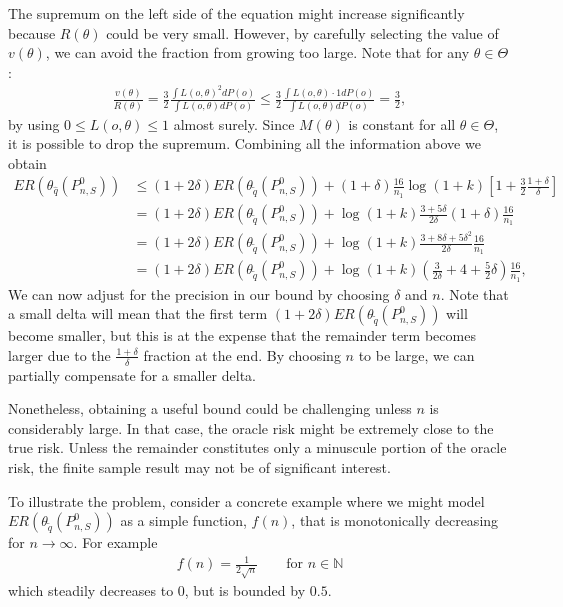 \documentclass[11pt, a4paper]{article}
\theoremstyle{definition}
\theoremstyle{remark}
\newcommand{\cl}{q}
\begin{document}
The supremum on the left side of the equation might increase significantly because $R(\theta)$ could be very small. However, by carefully selecting the value of $v(\theta)$, we can avoid the fraction from growing too large. Note that for any $ \theta \in \Theta $:
\begin{align*}
    \frac{v(\theta)}{R(\theta)} = \frac{3}{2} \frac{\int L(o, \theta)^2 d P(o)}{\int L(o, \theta) dP(o)  } \leq \frac{3}{2} \frac{\int L(o, \theta) \cdot 1 dP(o) }{\int L(o, \theta) dP(o) } = \frac{3}{2},
\end{align*}
by using $ 0 \leq L(o, \theta) \leq 1 $ almost surely. Since $ M(\theta) $ is constant for all $ \theta \in \Theta $, it is possible to drop the supremum. Combining all the information above we obtain 
\begin{align*}
   ER(\theta_{\hat{\cl}}(P_{n, S}^{0})) &\leq(1 + 2 \delta) ER(\theta_{ \tilde{\cl}}(P_{n,S}^{0})) +(1 + \delta) \frac{16}{n_1} \log (1 +k) \left[ 1 + \frac{3}{2} \frac{1 + \delta}{\delta}\right]\\
                                        &= (1 + 2 \delta) ER(\theta_{ \tilde{\cl}}(P_{n,S}^{0})) +\log (1 +k) \frac{3 + 5\delta}{2\delta}(1 + \delta) \frac{16}{n_1} \\
                                        &= (1 + 2 \delta) ER(\theta_{ \tilde{\cl}}(P_{n,S}^{0})) +\log (1 +k) \frac{3 + 8\delta + 5 \delta^2}{2\delta}\frac{16}{n_1} \\\
                                        &= (1 + 2 \delta) ER(\theta_{ \tilde{\cl}}(P_{n,S}^{0})) +\log (1 +k) \left( \frac{3}{2\delta} + 4 + \frac{5}{2} \delta \right) \frac{16}{n_1},
\end{align*}
We can now adjust for the precision in our bound by choosing $ \delta $ and $ n $. Note that a small delta will mean that the first term $ (1 + 2 \delta) E R(\theta_{ \tilde{q} }(P_{n, S}^{0})) $ will become smaller, but this is at the expense that the remainder term becomes larger due to the $ \frac{1 + \delta}{ \delta} $ fraction at the end. By choosing $ n $ to be large, we can partially compensate for a smaller delta.

Nonetheless, obtaining a useful bound could be challenging unless $n$ is considerably large. In that case, the oracle risk might be extremely close to the true risk. Unless the remainder constitutes only a minuscule portion of the oracle risk, the finite sample result may not be of significant interest.

To illustrate the problem, consider a concrete example where we might model $ ER(\theta_{ \tilde{\cl} }(P_{n, S}^{0})) $ as a simple function, $ f(n) $, that is monotonically decreasing for $ n \to \infty $. For example
\begin{align*}
    f(n)= \frac{1}{2\sqrt{n}} \qquad \text{for }  n \in \mathbb{N} 
\end{align*}
which steadily decreases to $ 0 $, but is bounded by $ 0.5 $. 
\end{document}
